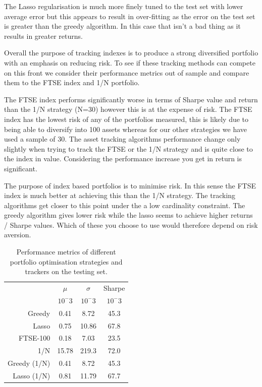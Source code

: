\documentclass[a4paper,10pt, twocolumn]{article}
\begin{document}
The Lasso regularisation is much more finely tuned to the test set with lower average error but this appears to result in over-fitting as the error on the test set is greater than the greedy algorithm. In this case that isn't a bad thing as it results in greater returns.

Overall the purpose of tracking indexes is to produce a strong diversified portfolio with an emphasis on reducing risk. To see if these tracking methods can compete on this front we consider their performance metrics out of sample and compare them to the FTSE index and 1/N portfolio. 

The FTSE index performs significantly worse in terms of Sharpe value and return than the 1/N strategy (N=30) however this is at the expense of risk. The FTSE index has the lowest risk of any of the portfolios measured, this is likely due to being able to diversify into 100 assets whereas for our other strategies we have used a sample of 30. The asset tracking algorithms performance change only slightly when trying to track the FTSE or the 1/N strategy and is quite close to the index in value. Considering the performance increase you get in return is significant.  

The purpose of index based portfolios is to minimise risk. In this sense the FTSE index is much better at achieving this than the 1/N strategy. The tracking algorithms get closer to this point under the a low cardinality constraint. The greedy algorithm gives lower risk while the lasso seems to achieve higher returns / Sharpe values. Which of these you choose to use would therefore depend on risk aversion. 
    
\begin{table}
\begin{tabular}{|r|c|c|c|}
\hline
& $\mu$ & $\sigma$ & Sharpe \\
& $10^-3$ & $10^-3$ & $10^-3$ \\
\hline
Greedy & 0.41 & 8.72 & 45.3 \\
Lasso & 0.75 & 10.86 & 67.8 \\
FTSE-100 & 0.18 & 7.03 & 23.5 \\
1/N & 15.78 & 219.3 & 72.0 \\
Greedy (1/N) & 0.41 & 8.72 & 45.3 \\
Lasso (1/N) & 0.81 & 11.79 & 67.7 \\
\hline
\end{tabular}
\caption{Performance metrics of different portfolio optimisation strategies and trackers on the testing set.}
\label{tab:2}
\end{table}
    
\end{document}
